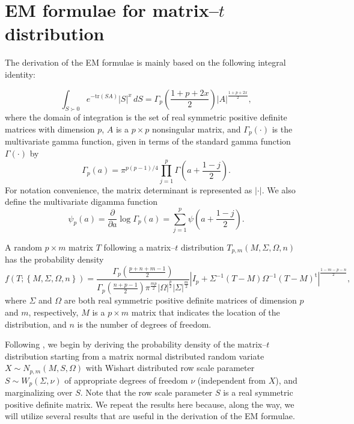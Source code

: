 \documentclass[english,listof=totoc]{scrartcl}
\begin{document}
\section{EM formulae for matrix--$t$ distribution}\label{sec:derivation}

The derivation of the EM formulae is mainly based on the following
integral identity:

\begin{equation}
\int_{S\succ 0}e^{-\textrm{tr}(SA)}|S|^{x}\,dS=\Gamma_{p}\left(\frac{1+p+2x}{2}\right)|A|^{\frac{1+p+2x}{2}},\label{eq:intmultgammadef}
\end{equation}
where the domain of integration is the set of real symmetric
positive definite matrices with dimension $p$, $A$ is a $p\times p$
nonsingular matrix, and $\Gamma_{p}(\cdot)$ is the multivariate gamma
function, given in terms of the standard gamma function $\Gamma(\cdot)$
by
\begin{equation}
\Gamma_{p}(a)=\pi^{p(p-1)/4}\prod_{j=1}^{p}\Gamma\left(a+\frac{1-j}{2}\right).\label{eq:multgammadef}
\end{equation}
For notation convenience, the matrix determinant is represented as
$|\cdot|$. We also define the multivariate digamma function
%
\begin{equation} \psi_{p}(a)=\frac{\partial}{\partial
	a}\log\Gamma_{p}(a)=\sum_{j=1}^{p}\psi\left(a+\frac{1-j}{2}\right).
\end{equation}

A random $p\times m$ matrix $T$ following a matrix--$t$ distribution
$T_{p,m}(M,\Sigma,\Omega,n)$ has the probability density
\begin{equation}
f(T;\left\{M,\Sigma,\Omega,n\right\})=\frac{\Gamma_{p}\left(\frac{p+n+m-1}{2}\right)}{\Gamma_{p}\left(\frac{n+p-1}{2}\right)\pi^{\frac{mp}{2}}|\Omega|^{\frac{p}{2}}|\Sigma|^{\frac{m}{2}}}
|I_p+\Sigma^{-1}(T-M)\Omega^{-1}(T-M)^{\textrm{t}}|^{\frac{1-m-p-n}{2}},
\label{eq:matrixtpdf}
\end{equation}
where $\Sigma$ and $\Omega$ are both real symmetric positive definite
matrices of dimension $p$ and $m$, respectively, $M$ is a $p\times m$
matrix that indicates the location of the distribution, and $n$ is the
number of degrees of freedom.

Following \citet{gupta1999matrix}, we begin by deriving the
probability density of the matrix--$t$ distribution starting from
a matrix normal distributed random variate $X\sim N_{p,m}(M,S,\Omega)$
with Wishart distributed row scale parameter $S \sim W_{p}\left(\Sigma,\nu\right)$ of appropriate degrees of freedom $\nu$ (independent from $X$), and marginalizing over $S$. Note that the row scale
parameter $S$ is a real symmetric positive definite matrix. We repeat the results here because, along the way, we will utilize several results that are useful in the derivation of the EM formulae.
\end{document}
